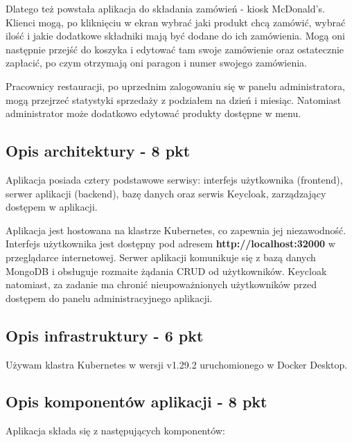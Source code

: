 \documentclass[12pt,a4paper]{article}
\begin{document}
Dlatego też powstała aplikacja do składania zamówień - kiosk McDonald's. Klienci mogą, po kliknięciu w ekran wybrać jaki produkt chcą zamówić, wybrać ilość i jakie dodatkowe składniki mają być dodane do ich zamówienia. Mogą oni następnie przejść do koszyka i edytować tam swoje zamówienie oraz ostatecznie zapłacić, po czym otrzymają oni paragon i numer swojego zamówienia.

Pracownicy restauracji, po uprzednim zalogowaniu się w panelu administratora, mogą przejrzeć statystyki sprzedaży z podziałem na dzień i miesiąc. Natomiast administrator może dodatkowo edytować produkty dostępne w menu.

\subsection{Opis architektury - 8 pkt}
\label{sec:introduction}
Aplikacja posiada cztery podstawowe serwisy: interfejs użytkownika (frontend), serwer aplikacji (backend), bazę danych oraz serwis Keycloak, zarządzający dostępem w aplikacji.

Aplikacja jest hostowana na klastrze Kubernetes, co zapewnia jej niezawodność. Interfejs użytkownika jest dostępny pod adresem \textbf{http://localhost:32000} w przeglądarce internetowej. Serwer aplikacji komunikuje się z bazą danych MongoDB i obsługuje rozmaite żądania CRUD od użytkowników. Keycloak natomiast, za zadanie ma chronić nieupoważnionych użytkowników przed dostępem do panelu administracyjnego aplikacji. 


\subsection{Opis infrastruktury - 6 pkt}
\label{sec:Users}

Używam klastra Kubernetes w wersji v1.29.2 uruchomionego w Docker Desktop.


\subsection{Opis komponentów aplikacji - 8 pkt}
\label{sec:FunctionalConditions}
Aplikacja składa się z następujących komponentów:
\end{document}
